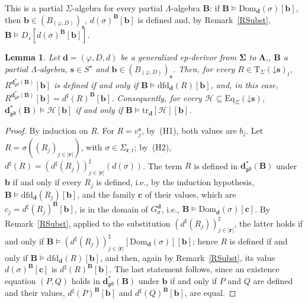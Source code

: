 \documentclass{amsart}
\newcommand{\bb}[1]{\ensuremath{\lvert #1 \rvert}}
\newcommand{\vs}[1]{\mathbin{\downarrow}#1}
\theoremstyle{plain}
\newtheorem{lemma}[theorem]{Lemma}
\theoremstyle{definition}
\begin{document}
This is a partial $\Sigma$-algebra for every partial $\Lambda$-algebra $\mathbf{B}$: if $\mathbf{B}\models\mathrm{Dom}_{\mathbf{d}}(\sigma)[\mathbf{b}]$, then $\mathbf{b}\in(B_{(\varphi,D)})_{\mathbf{s}}$, $d(\sigma)^{\mathbf{B}}[\mathbf{b}]$ is defined and, by Remark~\ref{RSubst}, $\mathbf{B}\models D_{s}[d(\sigma)^{\mathbf{B}}[\mathbf{b}]]$.

\begin{lemma}\label{LTranslation}
Let $\mathbf{d}=(\varphi,D,d)$ be a generalized ep-derivor from $\mathbf{\Sigma}$ to $\mathbf{\Lambda}$,, $\mathbf{B}$ a partial $\Lambda$-algebra, $\mathbf{s}\in S^{\star}$ and $\mathbf{b}\in(B_{(\varphi,D)})_{\mathbf{s}}$. Then, for every $R\in\mathrm{T}_{\Sigma}(\vs{\mathbf{s}})_{t}$, $R^{\mathbf{d}^{\ast}_{\mathfrak{gd}}(\mathbf{B})}[\mathbf{b}]$ is defined if and only if $\mathbf{B}\models\mathrm{dfd}_{\mathbf{d}}(R)[\mathbf{b}]$, and, in this case, $R^{\mathbf{d}^{\ast}_{\mathfrak{gd}}(\mathbf{B})}[\mathbf{b}]=d^{\sharp}(R)^{\mathbf{B}}[\mathbf{b}]$. Consequently, for every $\mathcal{H}\subseteq\mathrm{Eq}_{\Sigma}(\vs{\mathbf{s}})$, $\mathbf{d}^{\ast}_{\mathfrak{gd}}(\mathbf{B})\models\mathcal{H}[\mathbf{b}]$ if and only if $\mathbf{B}\models\mathrm{tr}_{\mathbf{d}}[\mathcal{H}][\mathbf{b}]$.
\end{lemma}
\begin{proof}
By induction on $R$. For $R=v^{\mathbf{s}}_{j}$, by~(H1), both values are $b_{j}$. Let $R=\sigma((R_{j})_{j\in\bb{\mathbf{r}}})$, with $\sigma\in\Sigma_{\mathbf{r},t}$; by~(H2), $d^{\sharp}(R)=(d^{\sharp}(R_{j}))^{\sharp}_{j\in\bb{\mathbf{r}}}(d(\sigma))$. The term $R$ is defined in $\mathbf{d}^{\ast}_{\mathfrak{gd}}(\mathbf{B})$ under $\mathbf{b}$ if and only if every $R_{j}$ is defined, i.e., by the induction hypothesis, $\mathbf{B}\models\mathrm{dfd}_{\mathbf{d}}(R_{j})[\mathbf{b}]$, and the family $\mathbf{c}$ of their values, which are $c_{j}=d^{\sharp}(R_{j})^{\mathbf{B}}[\mathbf{b}]$, is in the domain of $G^{\mathbf{d}}_{\sigma}$, i.e., $\mathbf{B}\models\mathrm{Dom}_{\mathbf{d}}(\sigma)[\mathbf{c}]$. By Remark~\ref{RSubst}, applied to the substitution $(d^{\sharp}(R_{j}))^{\sharp}_{j\in\bb{\mathbf{r}}}$, the latter holds if and only if $\mathbf{B}\models(d^{\sharp}(R_{j}))^{\sharp}_{j\in\bb{\mathbf{r}}}[\mathrm{Dom}_{\mathbf{d}}(\sigma)][\mathbf{b}]$; hence $R$ is defined if and only if $\mathbf{B}\models\mathrm{dfd}_{\mathbf{d}}(R)[\mathbf{b}]$, and then, again by Remark~\ref{RSubst}, its value $d(\sigma)^{\mathbf{B}}[\mathbf{c}]$ is $d^{\sharp}(R)^{\mathbf{B}}[\mathbf{b}]$. The last statement follows, since an existence equation $(P,Q)$ holds in $\mathbf{d}^{\ast}_{\mathfrak{gd}}(\mathbf{B})$ under $\mathbf{b}$ if and only if $P$ and $Q$ are defined and their values, $d^{\sharp}(P)^{\mathbf{B}}[\mathbf{b}]$ and $d^{\sharp}(Q)^{\mathbf{B}}[\mathbf{b}]$, are equal.
\end{proof}
\end{document}
